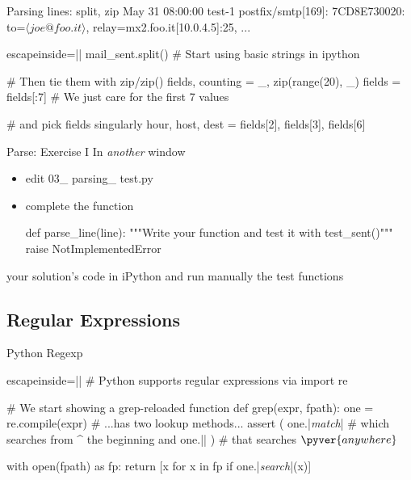 \begin{pyframe}{Parsing lines: split, zip}
{\footnotesize May 31 08:00:00 test-1 postfix/smtp[169]: 7CD8E730020: to=$\langle joe@foo.it\rangle$, relay=mx2.foo.it[10.0.4.5]:25, ...  }
\begin{pycode*}{escapeinside=||}
mail_sent.split()   # Start using basic strings in ipython

# Then tie them with zip/zip()
fields, counting  = _, zip(range(20), _)
fields = fields[:7] # We just care for the first 7 values

# and pick fields singularly
hour, host, dest = fields[2], fields[3], fields[6]

\end{pycode*}
\end{pyframe}


\begin{pyframe}{Parse: Exercise I }
In \emph{another} window
\begin{itemize}
\item edit 03\_ parsing\_ test.py
\item complete the  function
\begin{pycode}
def parse_line(line):
    """Write your function and test it
        with test_sent()"""
    raise NotImplementedError
\end{pycode}
\end{itemize}
 your solution's code in iPython and run manually
the test functions
\end{pyframe}



\subsection{Regular Expressions}

\begin{pyframe}{Python Regexp}
\begin{pycode*}{escapeinside=||}
# Python supports regular expressions via
import re

# We start showing a grep-reloaded function
def grep(expr, fpath):
    one = re.compile(expr) # ...has two lookup methods...
    assert ( one.|\emph{match}|     # which searches from ^ the beginning
         and one.|| ) # that searches $\pyver{anywhere}$

    with open(fpath) as fp:
        return [x for x in fp if one.|\emph{search}|(x)]

\end{pycode*}
\end{pyframe}

